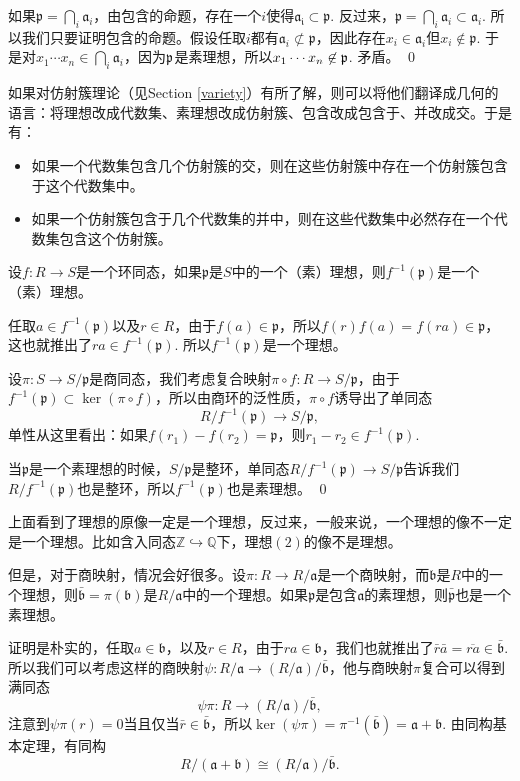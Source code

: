 \proof
	如果$\mathfrak{p}=\bigcap_i \mathfrak{a}_i$，由包含的命题，存在一个$i$使得$\mathfrak{a_i}\subset \mathfrak{p}$. 反过来，$\mathfrak{p}=\bigcap_i \mathfrak{a}_i\subset \mathfrak{a}_i$. 所以我们只要证明包含的命题。假设任取$i$都有$\mathfrak{a}_i\not\subset \mathfrak{p}$，因此存在$x_i\in\mathfrak{a}_i$但$x_i\not\in \mathfrak{p}$. 于是对$x_1\cdots x_n\in \bigcap_{i} \mathfrak{a}_i$，因为$\mathfrak{p}$是素理想，所以$x_1\cdots x_n\not\in \mathfrak{p}$. 矛盾。
\qed

\para 如果对仿射簇理论（见Section \ref{variety}）有所了解，则可以将他们翻译成几何的语言：将理想改成代数集、素理想改成仿射簇、包含改成包含于、并改成交。于是有：
\begin{itemize}
\item 如果一个代数集包含几个仿射簇的交，则在这些仿射簇中存在一个仿射簇包含于这个代数集中。
\item 如果一个仿射簇包含于几个代数集的并中，则在这些代数集中必然存在一个代数集包含这个仿射簇。
\end{itemize}

\para 设$f:R\to S$是一个环同态，如果$\mathfrak{p}$是$S$中的一个（素）理想，则$f^{-1}(\mathfrak{p})$是一个（素）理想。

\proof
	任取$a\in f^{-1}(\mathfrak{p})$以及$r\in R$，由于$f(a)\in \mathfrak{p}$，所以$f(r)f(a)=f(ra)\in \mathfrak{p}$，这也就推出了$ra\in f^{-1}(\mathfrak{p})$. 所以$f^{-1}(\mathfrak{p})$是一个理想。

	设$\pi:S\to S/\mathfrak{p}$是商同态，我们考虑复合映射$\pi\circ f:R\to S/\mathfrak{p}$，由于$f^{-1}(\mathfrak{p})\subset \ker(\pi\circ f)$，所以由商环的泛性质，$\pi\circ f$诱导出了单同态\[R/f^{-1}(\mathfrak{p})\to S/\mathfrak{p},\]
	单性从这里看出：如果$f(r_1)-f(r_2)=\mathfrak{p}$，则$r_1-r_2\in f^{-1}(\mathfrak{p})$. 

	当$\mathfrak{p}$是一个素理想的时候，$S/\mathfrak{p}$是整环，单同态$R/f^{-1}(\mathfrak{p})\to S/\mathfrak{p}$告诉我们$R/f^{-1}(\mathfrak{p})$也是整环，所以$f^{-1}(\mathfrak{p})$也是素理想。
\qed

\para 上面看到了理想的原像一定是一个理想，反过来，一般来说，一个理想的像不一定是一个理想。比如含入同态$\mathbb{Z}\hookrightarrow \mathbb{Q}$下，理想$(2)$的像不是理想。

但是，对于商映射，情况会好很多。设$\pi:R\to R/\mathfrak{a}$是一个商映射，而$\mathfrak{b}$是$R$中的一个理想，则$\bar{\mathfrak{b}}=\pi(\mathfrak{b})$是$R/\mathfrak{a}$中的一个理想。如果$\mathfrak{p}$是包含$\mathfrak{a}$的素理想，则$\bar{\mathfrak{p}}$也是一个素理想。

证明是朴实的，任取$a\in \mathfrak{b}$，以及$r \in R$，由于$ra\in \mathfrak{b}$，我们也就推出了$\bar{r}\bar{a}=\overline{ra}\in \bar{\mathfrak{b}}$. 所以我们可以考虑这样的商映射$\psi: R/\mathfrak{a}\to (R/\mathfrak{a})/\bar{\mathfrak{b}}$，他与商映射$\pi$复合可以得到满同态
\[
	\psi\pi:R\to (R/\mathfrak{a})/\bar{\mathfrak{b}},
\]
注意到$\psi\pi(r)=0$当且仅当$\bar{r}\in \bar{\mathfrak{b}}$，所以$\ker(\psi\pi)=\pi^{-1}(\bar{\mathfrak{b}})=\mathfrak{a}+\mathfrak{b}$. 由同构基本定理，有同构
\[
	R/(\mathfrak{a}+\mathfrak{b})\cong (R/\mathfrak{a})/\bar{\mathfrak{b}}.
\]

